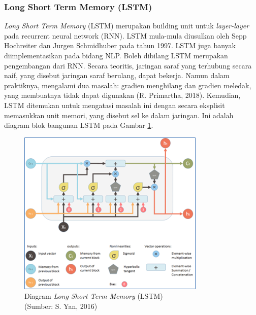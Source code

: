 \subsubsection{Long Short Term Memory (LSTM)}
\hspace{1,2cm}\textit{Long Short Term Memory} (LSTM) merupakan building unit untuk \textit{layer-layer} pada recurrent neural network (RNN). LSTM mula-mula diusulkan oleh Sepp Hochreiter dan Jurgen Schmidhuber pada tahun 1997. LSTM juga banyak diimplementasikan pada bidang NLP. Boleh dibilang LSTM merupakan pengembangan dari RNN. Secara teoritis, jaringan saraf yang terhubung secara naif, yang disebut jaringan saraf berulang, dapat bekerja. Namun dalam praktiknya, mengalami dua masalah: gradien menghilang dan gradien meledak, yang membuatnya tidak dapat digunakan (R. Primartha, 2018).  Kemudian, LSTM ditemukan untuk mengatasi masalah ini dengan secara eksplisit memasukkan unit memori, yang disebut sel ke dalam jaringan. Ini adalah diagram blok bangunan LSTM pada Gambar \ref{img:Diagram-LSTM}.

\begin{figure}[H]
	\vspace{-0.1cm}
	\begin{center}
		\includegraphics[width=0.8\columnwidth]{bab2/Gambar/Picture15.png}
	\end{center}
	\vspace{-0.2cm}
	\captionsetup{justification=centering}
	\caption{Diagram \textit{Long Short Term Memory} (LSTM) \\(Sumber: S. Yan, 2016)}\label{img:Diagram-LSTM}
\end{figure}

